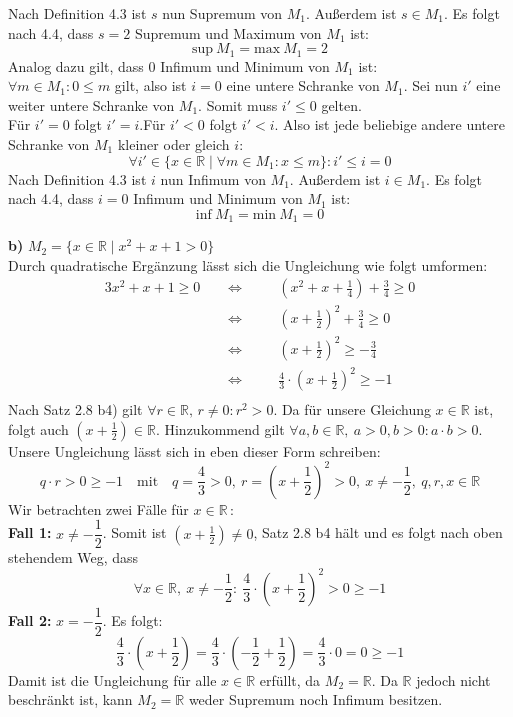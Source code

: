 \documentclass[a4paper,graphics,11pt]{article}
\begin{document}
Nach Definition 4.3 ist $s$ nun Supremum von $M_1$. Außerdem ist $s \in M_1$.
Es folgt nach 4.4, dass $s=2$ Supremum und Maximum von $M_1$ ist:
$$
    \text{sup}\ M_1 = \text{max}\ M_1 = 2
$$
Analog dazu gilt, dass $0$ Infimum und Minimum von $M_1$ ist:\\
$\forall m \in M_1\colon 0 \leq m$ gilt, also ist $i=0$ eine untere Schranke von $M_1$. 
Sei nun $i'$ eine weiter untere Schranke von $M_1$. Somit muss $i' \leq 0$ gelten.\\
Für $i'=0$ folgt $i' = i$.\quad Für $i' < 0$ folgt $i'<i$. Also ist jede beliebige andere
untere Schranke von $M_1$ kleiner oder gleich $i$:
$$
    \forall i' \in \{x \in \mathbb{R} \mid \forall m \in M_1\colon x \leq m\} \colon i' \leq i = 0
$$
Nach Definition 4.3 ist $i$ nun Infimum von $M_1$. Außerdem ist $i \in M_1$. Es folgt nach 
4.4, dass $i=0$ Infimum und Minimum von $M_1$ ist:
$$\text{inf}\ M_1 = \text{min}\ M_1 = 0$$

\newpage

\textbf{b)} $M_2 = \{x \in \mathbb{R} \mid x^2+x+1 > 0\}$\\
Durch quadratische Ergänzung lässt sich die Ungleichung wie folgt umformen:
\begin{alignat*}{3}
    x^2+x+1 \geq 0\quad&\,\Longleftrightarrow\quad&& \left(x^2+x+\frac{1}{4}\right) + \frac{3}{4} \geq 0\\[1pt]
    &\,\Longleftrightarrow\,&& \left(x+\frac{1}{2}\right)^2 + \frac{3}{4} \geq 0\\[1pt]
    &\,\Longleftrightarrow\,&& \left(x+\frac{1}{2}\right)^2 \geq -\frac{3}{4}\\[1pt]
    &\,\Longleftrightarrow\,&& \frac{4}{3} \cdot \left(x+\frac{1}{2}\right)^2 \geq -1\\[1pt]
\end{alignat*}
Nach Satz 2.8 b4) gilt $\forall r \in \mathbb{R},\,r\neq 0\colon r^2>0$. Da für unsere
Gleichung $x\in \mathbb{R}$ ist, folgt auch $\left(x+\frac{1}{2}\right)\in \mathbb{R}$.
Hinzukommend gilt $\forall a,b \in \mathbb{R},\ a>0,b>0 \colon a\cdot b >0$. Unsere
Ungleichung lässt sich in eben dieser Form schreiben:
$$
    q \cdot r >0\geq -1\quad \text{mit}\quad q = \frac{4}{3}>0,\  r =\left(x+\frac{1}{2}\right)^2> 0,\ x \neq -\frac{1}{2},\ q,r,x \in \mathbb{R}
$$
Wir betrachten zwei Fälle für $x \in \mathbb{R}$\,:\\[5pt]
\textbf{Fall 1:} $x\neq -\dfrac{1}{2}$. Somit ist $\left(x+\frac{1}{2}\right) \neq 0$,
Satz 2.8 b4 hält und es folgt nach oben stehendem Weg, dass
$$
    \forall x \in \mathbb{R},\ x \neq -\frac{1}{2}\colon\ \frac{4}{3}\cdot\left(x+\frac{1}{2}\right)^2 > 0 \geq -1
$$
\textbf{Fall 2:} $x = -\dfrac{1}{2}$. Es folgt:
$$
    \frac{4}{3} \cdot \left(x+\frac{1}{2}\right)
    = \frac{4}{3} \cdot \left(-\frac{1}{2} +\frac{1}{2}\right)
    = \frac{4}{3} \cdot 0 = 0 \geq -1
$$
Damit ist die Ungleichung für alle $x \in \mathbb{R}$ erfüllt, da $M_2 = \mathbb{R}$. Da
$\mathbb{R}$ jedoch nicht beschränkt ist, kann $M_2 = \mathbb{R}$ weder Supremum noch
Infimum besitzen.\\
\\
\\
\end{document}
